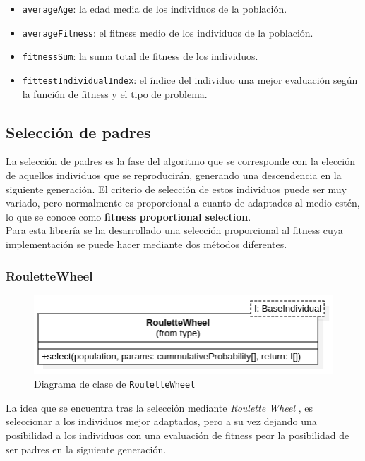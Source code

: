 \begin{itemize}
    \item \texttt{averageAge}: la edad media de los individuos de la población.
    \item \texttt{averageFitness}: el fitness medio de los individuos de la población.
    \item \texttt{fitnessSum}: la suma total de fitness de los individuos.
    \item \texttt{fittestIndividualIndex}: el índice del individuo una mejor evaluación según la función de fitness y el tipo de problema.
\end{itemize}

\subsection{Selección de padres}

La selección de padres es la fase del algoritmo que se corresponde con la elección de aquellos individuos que se reproducirán, generando una descendencia en la siguiente generación. El criterio de selección de estos individuos puede ser muy variado, pero normalmente es proporcional a cuanto de adaptados al medio estén, lo que se conoce como \textbf{fitness proportional selection}. \\

Para esta librería se ha desarrollado una selección proporcional al fitness cuya implementación se puede hacer mediante dos métodos diferentes.

\subsubsection{RouletteWheel}

\begin{figure}[H]
    \centering
    \includegraphics[scale=0.7]{mem/images/cap-4/4.2.5(Selection)/RouletteWheel.png}
    \caption{Diagrama de clase de \texttt{RouletteWheel}}
    \label{fig:generator-uml}
\end{figure}


La idea que se encuentra tras la selección mediante \textit{Roulette Wheel} \cite{DBLP:journals/corr/abs-1109-3627}, es seleccionar a los individuos mejor adaptados, pero a su vez dejando una posibilidad a los individuos con una evaluación de fitness peor la posibilidad de ser padres en la siguiente generación. \\

